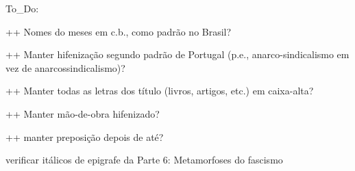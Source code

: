 To_Do:

++ Nomes do meses em c.b., como padrão no Brasil?

++ Manter hifenização segundo padrão de Portugal (p.e., anarco-sindicalismo em vez de anarcossindicalismo)?

++ Manter todas as letras dos título (livros, artigos, etc.) em caixa-alta?

++ Manter mão-de-obra hifenizado?

++ manter preposição depois de até?



verificar itálicos de epigrafe da Parte 6: Metamorfoses do fascismo